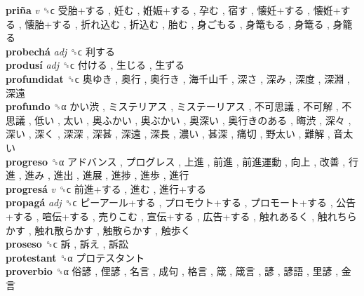 \textbf{priña} \emph{v}  ␝ϲ   受胎+する ,  妊む ,  姙娠+する ,  孕む ,  宿す ,  懐妊+する ,  懐姙+する ,  懐胎+する ,  折れ込む ,  折込む ,  胎む ,  身ごもる ,  身篭もる ,  身篭る ,  身籠る   \\
\textbf{probechá} \emph{adj}  ␝ϲ   利する   \\
\textbf{produsí} \emph{adj}  ␝ϲ   付ける ,  生じる ,  生ずる   \\
\textbf{profundidat} ␝ϲ   奥ゆき ,  奥行 ,  奥行き ,  海千山千 ,  深さ ,  深み ,  深度 ,  深淵 ,  深遠   \\
\textbf{profundo} ␝α   かい渋 ,  ミステリアス ,  ミステーリアス ,  不可思議 ,  不可解 ,  不思議 ,  低い ,  太い ,  奥ふかい ,  奥ぶかい ,  奥深い ,  奥行きのある ,  晦渋 ,  深々 ,  深い ,  深く ,  深深 ,  深甚 ,  深遠 ,  深長 ,  濃い ,  甚深 ,  痛切 ,  野太い ,  難解 ,  音太い   \\
\textbf{progreso} ␝α   アドバンス ,  プログレス ,  上進 ,  前進 ,  前進運動 ,  向上 ,  改善 ,  行進 ,  進み ,  進出 ,  進展 ,  進捗 ,  進歩 ,  進行   \\
\textbf{progresá} \emph{v}  ␝ϲ   前進+する ,  進む ,  進行+する   \\
\textbf{propagá} \emph{adj}  ␝ϲ   ピーアール+する ,  プロモウト+する ,  プロモート+する ,  公告+する ,  喧伝+する ,  売りこむ ,  宣伝+する ,  広告+する ,  触れあるく ,  触れちらかす ,  触れ散らかす ,  触散らかす ,  触歩く   \\
\textbf{proseso} ␝ϲ   訴 ,  訴え ,  訴訟   \\
\textbf{protestant} ␝α   プロテスタント   \\
\textbf{proverbio} ␝α   俗諺 ,  俚諺 ,  名言 ,  成句 ,  格言 ,  箴 ,  箴言 ,  諺 ,  諺語 ,  里諺 ,  金言   \\
